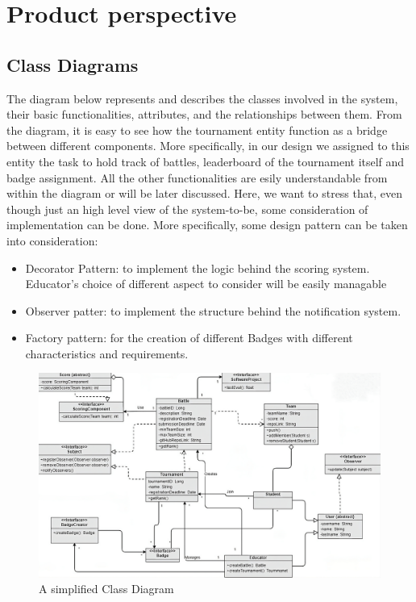 \section{Product perspective}
\label{sec:product_perspective}%

\subsection{Class Diagrams}
\label{subsec:class_diagrams}%
The diagram below represents and describes the classes involved in the system, their basic functionalities, attributes,
and the relationships between them.
From the diagram, it is easy to see how the tournament entity function as a bridge between different
components. More specifically, in our design we assigned to this entity the task to hold track 
of battles, leaderboard of the tournament itself and badge assignment.
All the other functionalities are esily understandable from within the diagram or 
will be later discussed. \newline
Here, we want to stress that, even though just an high level view of the system-to-be, some consideration of implementation can be done. 
More specifically, some design pattern can be taken into consideration:
\begin{itemize}
    \item Decorator Pattern: to implement the logic behind the scoring system. Educator's choice of different aspect to consider will be easily managable 
    \item Observer patter: to implement the structure behind the notification system.
    \item Factory pattern: for the creation of different Badges with different characteristics and requirements.
  \end{itemize}

\begin{figure}[H]
    \begin{center}
        \includegraphics[width=0.9\linewidth]{Images/class-diagram.jpeg}
        \caption{A simplified Class Diagram}
        \label{fig:class_diagram_pic}%
    \end{center}
\end{figure}

